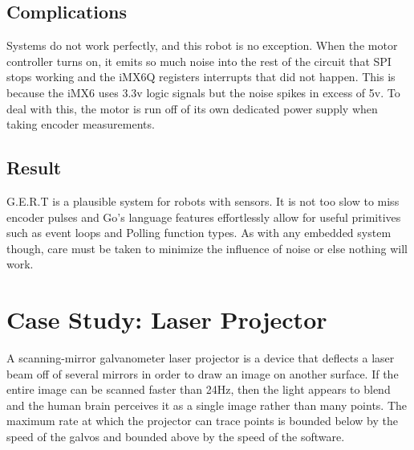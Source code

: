 \subsection{Complications}
Systems do not work perfectly, and this robot is no exception. When the motor controller turns on,
it emits so much noise into the rest of the circuit that SPI stops working and the iMX6Q registers
interrupts that did not happen. This is because the iMX6 uses 3.3v logic signals but the noise spikes
in excess of 5v. To deal with this, the motor is run off of its own dedicated power supply
when taking encoder measurements.

\subsection{Result}
G.E.R.T is a plausible system for robots with sensors. It is not too slow to miss encoder pulses
and Go's language features effortlessly allow for useful primitives such as event loops and Polling function
types. As with any embedded system though, care must be taken to minimize the influence of noise or else nothing
will work.


\section{Case Study: Laser Projector}
A scanning-mirror galvanometer laser projector is a device that deflects a laser beam off of several mirrors in
order to draw an image on another surface. If the entire image can be scanned faster than 24Hz, then the light appears
to blend and the human brain perceives it as a single image rather than many points. The maximum rate at which the
projector can trace points is bounded below by the speed of the galvos and bounded above by the speed of the software.
